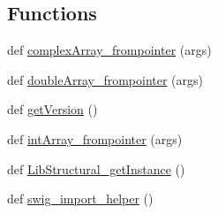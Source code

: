 \subsection*{Functions}
\begin{DoxyCompactItemize}
\item 
def \hyperlink{namespacestructural_a82f8f336182548d199c1620ab06254ae}{complex\+Array\+\_\+frompointer} (args)
\item 
def \hyperlink{namespacestructural_a1f999f4a06c57d864a7c81f1941323fe}{double\+Array\+\_\+frompointer} (args)
\item 
def \hyperlink{namespacestructural_a1dcedcd654a7cba8174b7e162202ec94}{get\+Version} ()
\item 
def \hyperlink{namespacestructural_a43e037b0f83fbdafde01a83b08756daf}{int\+Array\+\_\+frompointer} (args)
\item 
def \hyperlink{namespacestructural_aefad0e10496f3a1232bbc0f6c15ebe37}{Lib\+Structural\+\_\+get\+Instance} ()
\item 
def \hyperlink{namespacestructural_a0545e93156739c04546eaf4842728207}{swig\+\_\+import\+\_\+helper} ()
\end{DoxyCompactItemize}
